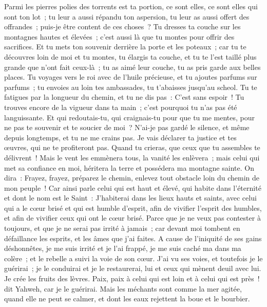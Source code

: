 \begin{multicols}{2}
Parmi les pierres polies des torrents est ta portion, ce sont elles, ce sont elles qui sont ton lot~; tu leur a aussi répandu ton aspersion, tu leur as aussi offert des offrandes~; puis-je être content de ces choses~?
Tu dresses ta couche sur les montagnes hautes et élevées~; c'est aussi là que tu montes pour offrir des sacrifices.
Et tu mets ton souvenir derrière la porte et les poteaux~; car tu te découvres loin de moi et tu montes, tu élargis ta couche, et tu te l'est taillé plus grande que n'ont fait ceux-là~; tu as aimé leur couche, tu as pris garde aux belles places.
Tu voyages vers le roi avec de l'huile précieuse, et tu ajoutes parfums sur parfums~; tu envoies au loin tes ambassades, tu t'abaisses jusqu'au scheol.
Tu te fatigues par la longueur du chemin, et tu ne dis pas~: C'est sans espoir~! Tu trouves encore de la vigueur dans ta main~; c'est pourquoi tu n'as pas été languissante.
Et qui redoutais-tu, qui craignais-tu pour que tu me mentes, pour ne pas te souvenir et te soucier de moi~? N'ai-je pas gardé le silence, et même depuis longtemps, et tu ne me crains pas.
Je vais déclarer ta justice et tes œuvres, qui ne te profiteront pas.
Quand tu crieras, que ceux que tu assembles te délivrent~! Mais le vent les emmènera tous, la vanité les enlèvera~; mais celui qui met sa confiance en moi, héritera la terre et possédera ma montagne sainte.
On dira~: Frayez, frayez, préparez le chemin, enlevez tout obstacle loin du chemin de mon peuple~!
Car ainsi parle celui qui est haut et élevé, qui habite dans l'éternité et dont le nom est le Saint~: J'habiterai dans les lieux hauts et saints, avec celui qui a le cœur brisé et qui est humble d'esprit, afin de vivifier l'esprit des humbles, et afin de vivifier ceux qui ont le cœur brisé.
Parce que je ne veux pas contester à toujours, et que je ne serai pas irrité à jamais~; car devant moi tombent en défaillance les esprits, et les âmes que j'ai faites.
A cause de l'iniquité de ses gains déshonnêtes, je me suis irrité et je l'ai frappé, je me suis caché ma dans ma colère~; et le rebelle a suivi la voie de son cœur.
J'ai vu ses voies, et toutefois je le guérirai~; je le conduirai et je le restaurerai, lui et ceux qui mènent deuil avec lui.
Je crée les fruits des lèvres. Paix, paix à celui qui est loin et à celui qui est près~! dit Yahweh, car je le guérirai.
Mais les méchants sont comme la mer agitée, quand elle ne peut se calmer, et dont les eaux rejettent la boue et le bourbier.

\end{multicols}
